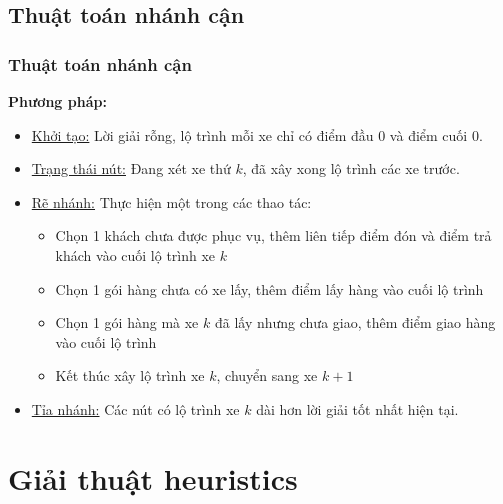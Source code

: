 \documentclass{beamer}
\begin{document}
	\subsection{Thuật toán nhánh cận}
	\begin{frame}
		\frametitle{Thuật toán nhánh cận}
		\textbf{Phương pháp:}
		\begin{itemize}
			\item \underline{Khởi tạo:} Lời giải rỗng, lộ trình mỗi xe chỉ có điểm đầu $0$ và điểm cuối $0$.
			\item \underline{Trạng thái nút:} Đang xét xe thứ $k$, đã xây xong lộ trình các xe trước.
			\item {
				\underline{Rẽ nhánh:} Thực hiện một trong các thao tác:
				\begin{itemize}
					\item Chọn 1 khách chưa được phục vụ, thêm liên tiếp điểm đón và điểm trả khách vào cuối lộ trình xe $k$
					\item Chọn 1 gói hàng chưa có xe lấy, thêm điểm lấy hàng vào cuối lộ trình
					\item Chọn 1 gói hàng mà xe $k$ đã lấy nhưng chưa giao, thêm điểm giao hàng vào cuối lộ trình
					\item Kết thúc xây lộ trình xe $k$, chuyển sang xe $k+1$
				\end{itemize}
			}
			\item \underline{Tỉa nhánh:} Các nút có lộ trình xe $k$ dài hơn lời giải tốt nhất hiện tại.
		\end{itemize}
	\end{frame}
	
	
	\section{Giải thuật heuristics}
	
	
\end{document}
